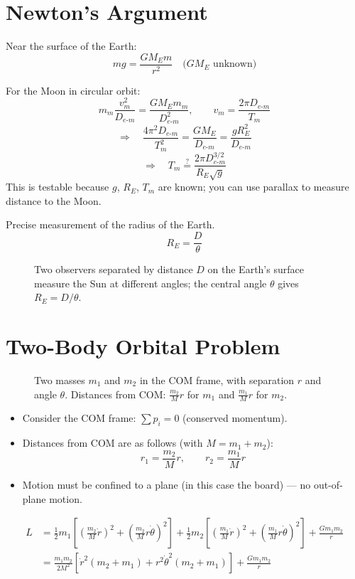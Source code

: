 \section{Newton's Argument}

Near the surface of the Earth:
\[
    mg = \frac{G M_E m}{r^2} \quad \text{($G M_E$ unknown)}
\]

For the Moon in circular orbit:
\[
    m_m \frac{v_m^2}{D_{e\text{-}m}} = \frac{G M_E m_m}{D_{e\text{-}m}^2}, \qquad v_m = \frac{2\pi D_{e\text{-}m}}{T_m}
\]
\[
    \Rightarrow\quad \frac{4\pi^2 D_{e\text{-}m}}{T_m^2} = \frac{G M_E}{D_{e\text{-}m}} = \frac{g R_E^2}{D_{e\text{-}m}}
\]
\[
    \Rightarrow\quad
    \boxed{T_m \stackrel{?}{=} \frac{2\pi D_{e\text{-}m}^{3/2}}{R_E \sqrt{g}}}
\]
This is testable because $g$, $R_E$, $T_m$ are known; you can use parallax to measure distance to the Moon.

\begin{example}[Eratosthenes]
Precise measurement of the radius of the Earth.
\[
    R_E = \frac{D}{\theta}
\]
\begin{figure}[H]
\centering
\caption{Two observers separated by distance $D$ on the Earth's surface measure the Sun at different angles; the central angle $\theta$ gives $R_E = D/\theta$.}
\end{figure}
\end{example}

\section{Two-Body Orbital Problem}

\begin{figure}[H]
\centering
\caption{Two masses $m_1$ and $m_2$ in the COM frame, with separation $r$ and angle $\theta$. Distances from COM: $\frac{m_2}{M}r$ for $m_1$ and $\frac{m_1}{M}r$ for $m_2$.}
\end{figure}

\begin{itemize}
    \item Consider the COM frame: $\sum p_i = 0$ (conserved momentum).
    \item Distances from COM are as follows (with $M = m_1 + m_2$):
    \[
        r_1 = \frac{m_2}{M}r, \qquad r_2 = \frac{m_1}{M}r
    \]
    \item Motion must be confined to a plane (in this case the board) --- no out-of-plane motion.
\end{itemize}

\begin{align*}
    L &= \tfrac{1}{2}m_1\left[\left(\frac{m_2}{M}\dot{r}\right)^2 + \left(\frac{m_2}{M}r\dot\theta\right)^2\right]
       + \tfrac{1}{2}m_2\left[\left(\frac{m_1}{M}\dot{r}\right)^2 + \left(\frac{m_1}{M}r\dot\theta\right)^2\right]
       + \frac{Gm_1 m_2}{r} \\
    &= \frac{m_1 m_2}{2M^2}\left[\dot{r}^2(m_2 + m_1) + r^2\dot\theta^2(m_2 + m_1)\right] + \frac{Gm_1 m_2}{r}
\end{align*}

